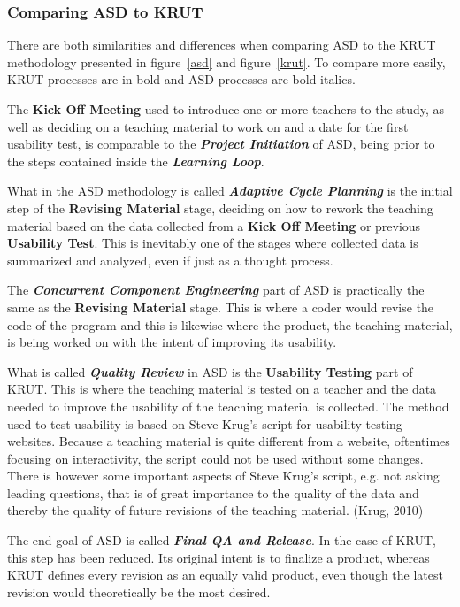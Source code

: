 \subsubsection*{Comparing ASD to KRUT} 
There are both similarities and differences when comparing ASD to the KRUT methodology presented in figure~\ref{asd} and figure~\ref{krut}. To compare more easily, KRUT-processes are in bold and ASD-processes are bold-italics. 

The \textbf{Kick Off Meeting} used to introduce one or more teachers to the study, as well as deciding on a teaching material to work on and a date for the first usability test, is comparable to the \textbf{\textit{Project Initiation}} of ASD, being prior to the steps contained inside the \textbf{\textit{Learning Loop}}.

What in the ASD methodology is called \textbf{\textit{Adaptive Cycle Planning}} is the initial step of the \textbf{Revising Material} stage, deciding on how to rework the teaching material based on the data collected from a \textbf{Kick Off Meeting} or previous \textbf{Usability Test}. This is inevitably one of the stages where collected data is summarized and analyzed, even if just as a thought process.

The \textbf{\textit{Concurrent Component Engineering}} part of ASD is practically the same as the \textbf{Revising Material} stage. This is where a coder would revise the code of the program and this is likewise where the product, the teaching material, is being worked on with the intent of improving its usability.

What is called \textbf{\textit{Quality Review}} in ASD is the \textbf{Usability Testing} part of KRUT. This is where the teaching material is tested on a teacher and the data needed to improve the usability of the teaching material is collected. The method used to test usability is based on Steve Krug’s script for usability testing websites. Because a teaching material is quite different from a website, oftentimes focusing on interactivity, the script could not be used without some changes. There is however some important aspects of Steve Krug’s script, e.g. not asking leading questions, that is of great importance to the quality of the data and thereby the quality of future revisions of the teaching material. (Krug, 2010)

The end goal of ASD is called \textbf{\textit{Final QA and Release}}. In the case of KRUT, this step has been reduced. Its original intent is to finalize a product, whereas KRUT defines every revision as an equally valid product, even though the latest revision would theoretically be the most desired.

